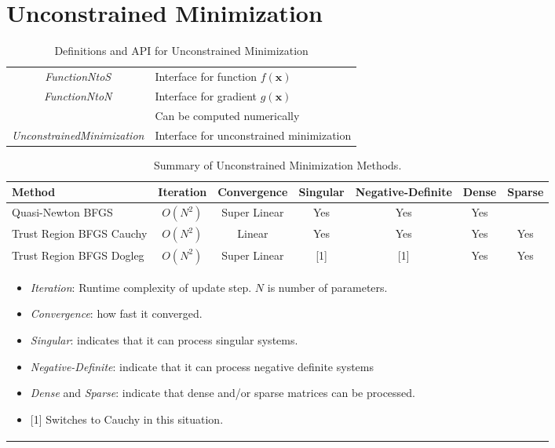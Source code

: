 \documentclass[peerreview,compsoc,onecolumn]{IEEEtran}
\begin{document}
\section{Unconstrained Minimization}

\begin{table}[h]
\centering
\caption{\label{definitions:UM}Definitions and API for Unconstrained Minimization}
\begin{tabular}{cl}
\textit{FunctionNtoS} & Interface for function $f(\bm{x})$ \\
\textit{FunctionNtoN} & Interface for gradient $g(\bm{x})$ \\
& Can be computed numerically \\
\textit{UnconstrainedMinimization} & Interface for unconstrained minimization
\end{tabular}
\end{table}

\begin{table}[h]
\caption{\label{summary:UM}Summary of Unconstrained Minimization Methods.}
\centering
\begin{tabular}{lcccccc}
Method & Iteration & Convergence & Singular & Negative-Definite & Dense & Sparse \\[1ex]
\hline
Quasi-Newton BFGS        & $O(N^2)$ & Super Linear & Yes & Yes & Yes &  \rule{0pt}{2.6ex} \\
Trust Region BFGS Cauchy & $O(N^2)$ & Linear       & Yes & Yes & Yes & Yes  \\
Trust Region BFGS Dogleg & $O(N^2)$ & Super Linear & [1] & [1] & Yes & Yes  \\[1ex]
\hline
\multicolumn{6}{l}{
\begin{minipage}{0.6\textwidth}
\centering
\vspace{2mm}
\begin{itemize}[leftmargin=*]
\item \emph{Iteration}: Runtime complexity of update step. $N$ is number of parameters.
\item \emph{Convergence}: how fast it converged.
\item \emph{Singular}: indicates that it can process singular systems.
\item \emph{Negative-Definite}: indicate that it can process negative definite systems
\item \emph{Dense} and \emph{Sparse}: indicate that dense and/or sparse matrices can be processed. 
\item {[1]} Switches to Cauchy in this situation.
\end{itemize}
\end{minipage}
 }
\end{tabular}
\end{table}
\end{document}
